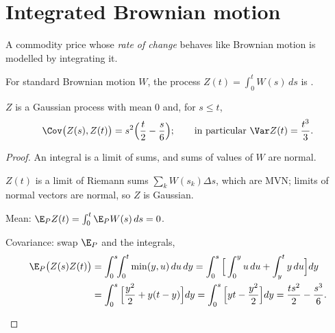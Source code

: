 \section{Integrated Brownian motion}

A commodity price whose \emph{rate of change} behaves like Brownian motion is modelled by integrating it.

\begin{definition}
For standard Brownian motion $W$, the process $Z(t)=\int_0^tW(s)\,ds$ is .
\end{definition}

\begin{result}
\label{res:ibm}
$Z$ is a Gaussian process with mean $0$ and, for $s\le t$,
\[
  \Cov\big(Z(s),Z(t)\big)=s^2\Big(\frac t2-\frac s6\Big);\qquad\text{in particular }\Var Z(t)=\frac{t^3}{3}.
\]
\end{result}
\begin{proof}
An integral is a limit of sums, and sums of values of $W$ are normal.
\begin{steps}
  \item $Z(t)$ is a limit of Riemann sums $\sum_kW(s_k)\Delta s$, which are MVN; limits of normal vectors are normal, so $Z$ is Gaussian.
  \item Mean: $\E_PZ(t)=\int_0^t\E_PW(s)\,ds=0$.
  \item Covariance: swap $\E_P$ and the integrals,
  \[
    \begin{aligned}
    \E_P\big(Z(s)Z(t)\big)&=\int_0^s\!\!\int_0^t\min(y,u)\,du\,dy=\int_0^s\Big[\int_0^yu\,du+\int_y^ty\,du\Big]dy\\
    &=\int_0^s\Big[\frac{y^2}{2}+y(t-y)\Big]dy=\int_0^s\Big[yt-\frac{y^2}{2}\Big]dy=\frac{ts^2}{2}-\frac{s^3}{6}. \qedhere
    \end{aligned}
  \]
\end{steps}
\end{proof}

\begin{pic}
\end{pic}

